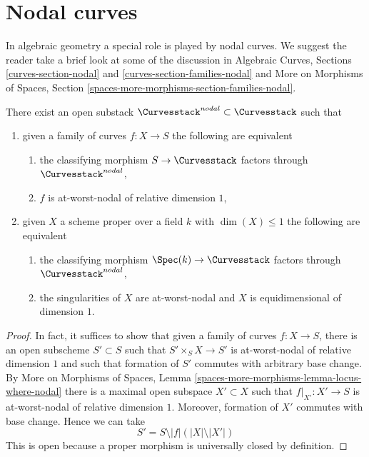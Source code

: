 \section{Nodal curves}
\label{section-nodal-curves}

\noindent
In algebraic geometry a special role is played by nodal curves.
We suggest the reader take a brief look at some of the discussion
in Algebraic Curves, Sections \ref{curves-section-nodal} and
\ref{curves-section-families-nodal}
and More on Morphisms of Spaces, Section
\ref{spaces-more-morphisms-section-families-nodal}.

\begin{lemma}
\label{lemma-nodal-curves}
There exist an open substack $\Curvesstack^{nodal} \subset \Curvesstack$
such that
\begin{enumerate}
\item given a family of curves $f : X \to S$ the following are equivalent
\begin{enumerate}
\item the classifying morphism $S \to \Curvesstack$ factors
through $\Curvesstack^{nodal}$,
\item $f$ is at-worst-nodal of relative dimension $1$,
\end{enumerate}
\item given $X$ a scheme proper over a field $k$ with
$\dim(X) \leq 1$ the following are equivalent
\begin{enumerate}
\item the classifying morphism $\Spec(k) \to \Curvesstack$ factors
through $\Curvesstack^{nodal}$,
\item the singularities of $X$ are at-worst-nodal and $X$
is equidimensional of dimension $1$.
\end{enumerate}
\end{enumerate}
\end{lemma}

\begin{proof}
In fact, it suffices to show that given a family of curves
$f : X \to S$, there is an open subscheme $S' \subset S$
such that $S' \times_S X \to S'$ is at-worst-nodal of relative dimension $1$
and such that formation of $S'$ commutes with arbitrary base change.
By More on Morphisms of Spaces, Lemma
\ref{spaces-more-morphisms-lemma-locus-where-nodal}
there is a maximal open subspace $X' \subset X$ such
that $f|_{X'} : X' \to S$ is at-worst-nodal of relative dimension $1$.
Moreover, formation of $X'$ commutes with base change.
Hence we can take
$$
S' = S \setminus |f|(|X| \setminus |X'|)
$$
This is open because a proper morphism is universally closed by
definition.
\end{proof}

